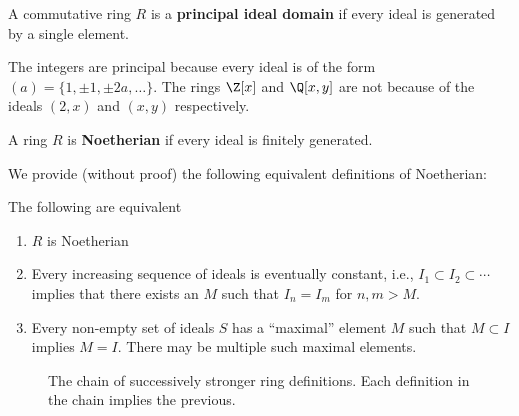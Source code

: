 \begin{definition}
    A commutative ring $R$ is a \textbf{principal ideal domain} if every ideal is generated by a single element.
\end{definition}

The integers are principal because every ideal is of the form $(a) = \{ 1, \pm 1, \pm2a, \ldots \}$.
The rings $\Z[x]$ and $\Q[x, y]$ are not because of the ideals $(2, x)$ and $(x, y)$ respectively.

\begin{definition}
    \label{def:noetherian}
    A ring $R$ is \textbf{Noetherian} if every ideal is finitely generated.
\end{definition}

We provide (without proof) the following equivalent definitions of Noetherian:

\begin{theorem}
    The following are equivalent
    \begin{enumerate}
        \item $R$ is Noetherian
        \item Every increasing sequence of ideals is eventually constant, i.e., $I_1 \subset I_2 \subset \cdots$ implies that there exists an $M$ such that $I_n = I_m$ for $n, m > M$.
        \item Every non-empty set of ideals $S$ has a ``maximal'' element $M$ such that $M \subset I$ implies $M = I$. There may be multiple such maximal elements.
    \end{enumerate}
\end{theorem}

\begin{figure}
    \centering
    \caption{The chain of successively stronger ring definitions. Each definition in the chain implies the previous.}
    \label{fig:ring-hierarchy}
\end{figure}

